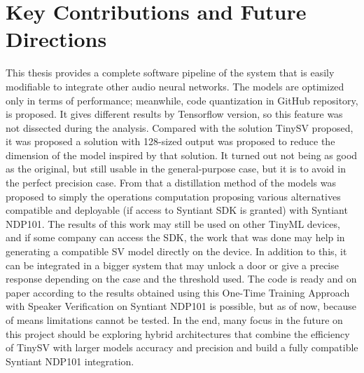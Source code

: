 \section{Key Contributions and Future Directions}
\label{sec:key contributions}
This thesis provides a complete software pipeline of the system that is easily modifiable to integrate other audio neural networks. The models are optimized only in terms of performance; meanwhile, code quantization in GitHub repository\cite{thesisresources}, is proposed. It gives different results by Tensorflow version, so this feature was not dissected during the analysis. Compared with the solution TinySV proposed\cite{dvector_extractor_TinySV}\cite{dvector_extractor_code}, it was proposed a solution with 128-sized output was proposed to reduce the dimension of the model inspired by that solution. It turned out not being as good as the original, but still usable in the general-purpose case, but it is to avoid in the perfect precision case. From that a distillation method of the models was proposed to simply the operations computation proposing various alternatives compatible and deployable (if access to Syntiant SDK is granted) with Syntiant NDP101. The results of this work may still be used on other TinyML devices, and if some company can access the SDK, the work that was done may help in generating a compatible SV model directly on the device. In addition to this, it can be integrated in a bigger system that may unlock a door or give a precise response depending on the case and the threshold used. The code is ready and on paper according to the results obtained using this One-Time Training Approach with Speaker Verification on Syntiant NDP101 is possible, but as of now, because of means limitations cannot be tested. In the end, many focus in the future on this project should be exploring hybrid architectures that combine the efficiency of TinySV with larger models accuracy and precision and build a fully compatible Syntiant NDP101 integration. %
\newpage